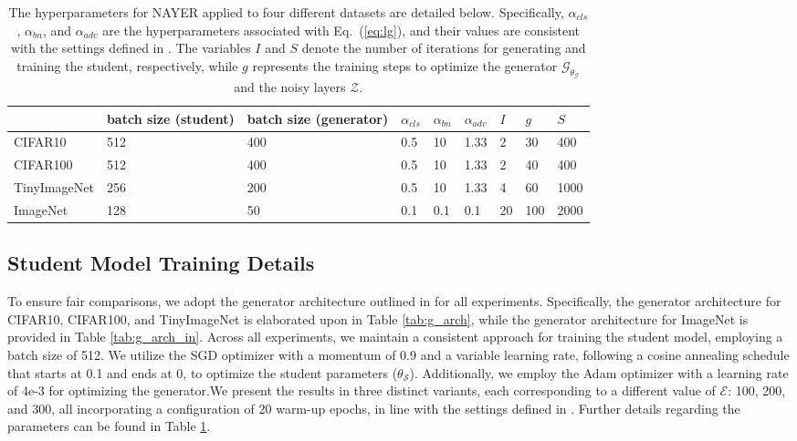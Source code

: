\documentclass{article} %
\begin{document}
\begin{table}[h]
\caption{The hyperparameters for NAYER applied to four different datasets are detailed below. Specifically, $\alpha_{cls}$, $\alpha_{bn}$, and $\alpha_{adv}$ are the hyperparameters associated with Eq.~(\ref{eq:lg}), and their values are consistent with the settings defined in \citep{fastdfkd}. The variables $I$ and $S$ denote the number of iterations for generating and training the student, respectively, while $g$ represents the training steps to optimize the generator $\mathcal{G}_{\theta_{\mathcal{G}}}$ and the noisy layers $\mathcal{Z}$.}
\begin{adjustbox}{width=1\linewidth}
\begin{tabular}{@{}lllllllll@{}}
\toprule
             & batch size (student) & batch size (generator) & $\alpha_{cls}$ & $\alpha_{bn}$ & $\alpha_{adv}$  & $I$  & $g$   & $S$    \\ \midrule
CIFAR10      & 512                  & 400                    & 0.5 & 10 & 1.33 & 2 & 30  & 400     \\
CIFAR100     & 512                  & 400                    & 0.5 & 10 & 1.33 & 2 & 40  & 400   \\
TinyImageNet & 256                  & 200                    & 0.5 & 10 & 1.33 & 4 & 60  & 1000  \\
ImageNet     & 128                  & 50                     & 0.1 & 0.1  & 0.1 & 20 & 100 & 2000 \\ \bottomrule
\end{tabular}
\end{adjustbox}
\label{tab:hyperpara}
\end{table}

\subsection{Student Model Training Details}

To ensure fair comparisons, we adopt the generator architecture outlined in \citep{fastdfkd} for all experiments. Specifically, the generator architecture for CIFAR10, CIFAR100, and TinyImageNet is elaborated upon in Table \ref{tab:g_arch}, while the generator architecture for ImageNet is provided in Table \ref{tab:g_arch_in}. Across all experiments, we maintain a consistent approach for training the student model, employing a batch size of 512. We utilize the SGD optimizer with a momentum of 0.9 and a variable learning rate, following a cosine annealing schedule that starts at 0.1 and ends at 0, to optimize the student parameters ($\theta_\mathcal{S}$). Additionally, we employ the Adam optimizer with a learning rate of 4e-3 for optimizing the generator.We present the results in three distinct variants, each corresponding to a different value of $\mathcal{E}$: 100, 200, and 300, all incorporating a configuration of 20 warm-up epochs, in line with the settings defined in \citep{fastdfkd}. Further details regarding the parameters can be found in Table \ref{tab:hyperpara}.
\end{document}
